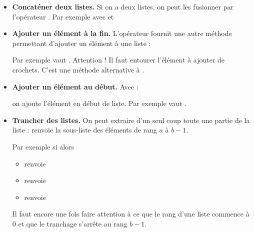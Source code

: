 \documentclass[11pt,class=report,crop=false]{standalone}
\begin{document}
\begin{cours}[Liste (3)]
\sauteligne
\begin{itemize}
  \item \textbf{Concaténer deux listes.} Si on a deux listes, on peut les fusionner par l'opérateur \og{}\ci{+}\fg{}. Par exemple avec 
   et    
  
    
  \item \textbf{Ajouter un élément à la fin.} L'opérateur \og{}\ci{+}\fg{} fournit une autre méthode permettant d'ajouter un élément à une liste : 
  
  Par exemple \ci{[1,2,3,4] + [5]} vaut \ci{[1,2,3,4,5]}.
  Attention ! Il faut entourer l'élément à ajouter de crochets.   
  C'est une méthode alternative à .
  
  \item \textbf{Ajouter un élément au début.} Avec : 
  
  on ajoute l'élément en début de liste.
  Par exemple \ci{[5] + [1,2,3,4]} vaut \ci{[5,1,2,3,4]}. 
  
  \item \textbf{Trancher des listes.} On peut extraire d'un seul coup toute une partie de la liste :  renvoie la sous-liste des éléments de rang $a$ à $b-1$.
  
  \smallskip
  
  
    Par exemple si  alors  
  \begin{itemize}
    \item {} renvoie \ci{["B","C","D"]}
    \item {} renvoie \ci{["A","B"]}
    \item {} renvoie \ci{["E","F","G"]}
  \end{itemize} 
  Il faut encore une fois faire attention à ce que le rang d'une liste commence à $0$ et que le tranchage  s'arrête au rang $b-1$.
  
  
\end{itemize}
\end{cours}
\end{document}
